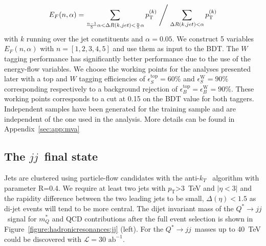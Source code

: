 \documentclass[a4paper,11pt]{article}
\newcommand{\ptSup}[1]{\ensuremath{p_{\text{T}}^{#1}}}
\newcommand{\pt}{\ensuremath{p_{\text{T}}}}
\newcommand*{\intlumifcc}{\ensuremath{\mathcal{L}=30\text{ ab}^{-1}}}
\newcommand*{\qjj}{\ensuremath{Q^{*} \rightarrow jj}}
\newcommand*{\jj}{\ensuremath{jj}}
\begin{document}

\begin{equation}
E_{F}(n,\alpha) =  \sum \limits_{\frac{n-1}{5}\alpha < \Delta R(k,jet)< \frac{n}{5}\alpha} \ptSup{(k)} \Biggm/ \sum \limits_{\Delta R(k,jet)< \alpha} \ptSup{(k)}
\end{equation}
with $k$ running over the jet constituents and $\alpha=0.05$. We construct 5 variables $E_{F}(n,\alpha)$ with $n=[1,2,3,4,5]$ and use them as input to the BDT.
The $W$ tagging performance has significantly better performance due to the use of the energy-flow variables. We choose the working points for the analyses presented later with a top and $W$ tagging efficiencies of $\epsilon_S^{\text{top}}=60\%$ and $\epsilon_S^{\text{W}}=90\%$ corresponding respectively to a background rejection of $\epsilon_B^{\text{top}}=\epsilon_B^{\text{W}}=90\%$. These working points corresponds to a cut at 0.15 on the BDT value for both taggers. Independent samples have been generated for the training sample and are independent of the one used in the analysis.  More details can be found in Appendix~\ref{sec:app:mva}

\subsection{The \jj\ final state}
\label{sec:hadjj}

Jets are clustered using particle-flow candidates with the anti-$k_T$~\cite{Cacciari:2008gp} algorithm with parameter R=0.4. We require at least two jets with $\pt$>3~TeV and $|\eta<3|$ and the rapidity difference between the two leading jets to be small, $\Delta(\eta)<1.5$ as di-jet events will tend to be more central. The dijet invariant mass of the \qjj\ signal for $m_Q^{*}$ and QCD contributions after the full event selection is shown in Figure~\ref{figure:hadronicresonances:jj} (left).
For the \qjj\ masses up to 40~TeV could be discovered with \intlumifcc.
\end{document}
